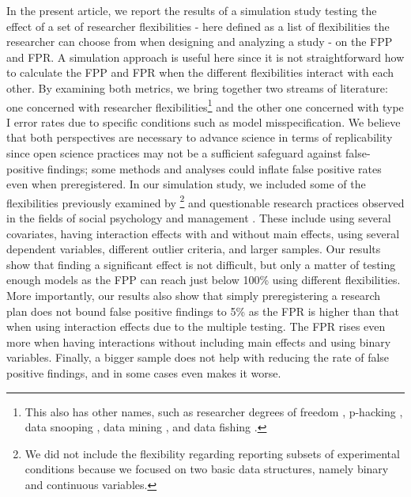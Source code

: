 In the present article, we report the results of a simulation study testing the effect of a set of researcher flexibilities - here defined as a list of flexibilities the researcher can choose from when designing and analyzing a study - on the FPP and FPR. A simulation approach is useful here since it is not straightforward how to calculate the FPP and FPR when the different flexibilities interact with each other. By examining both metrics, we bring together two streams of literature: one concerned with researcher flexibilities\footnote{This also has other names, such as researcher degrees of freedom \citep{Simmons2011}, p-hacking \citep{simonsohn2014p}, data snooping \citep{white2000reality}, data mining \citep{lovell1983}, and data fishing \citep{selvin1966data}.} and the other one concerned with type I error rates due to specific conditions such as model misspecification. We believe that both perspectives are necessary to advance science in terms of replicability since open science practices may not be a sufficient safeguard against false-positive findings; some methods and analyses could inflate false positive rates even when preregistered. In our simulation study, we included some of the flexibilities previously examined by \cite{Simmons2011}\footnote{We did not include the flexibility regarding reporting subsets of experimental conditions because we focused on two basic data structures, namely binary and continuous variables.} and questionable research practices observed in the fields of social psychology \citep{Cairo2020} and management \citep{OBoyle2017}. These include using several covariates, having interaction effects with and without main effects, using several dependent variables, different outlier criteria, and larger samples.  
Our results show that finding a significant effect is not difficult, but only a matter of testing enough models as the FPP can reach just below 100\% using different flexibilities. More importantly, our results also show that simply preregistering a research plan does not bound false positive findings to 5\% as the FPR is higher than that when using interaction effects due to the multiple testing. The FPR rises even more when having interactions without including main effects and using binary variables. Finally, a bigger sample does not help with reducing the rate of false positive findings, and in some cases even makes it worse. 
